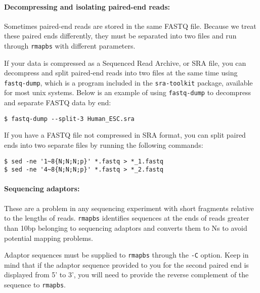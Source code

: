 \documentclass[10pt]{article}
\newcommand{\prog}[1]{\texttt{#1}}
\newcommand{\op}[1]{\texttt{#1}}
\begin{document}
\paragraph{Decompressing and isolating paired-end reads:}
Sometimes paired-end reads are stored in the same FASTQ file.  Because
we treat these paired ends differently, they must be separated into
two files and run through \prog{rmapbs} with different parameters.

If your data is compressed as a Sequenced Read Archive, or SRA file, you can
decompress and split paired-end reads into two files at the same time using
 \prog{fastq-dump}, which is a program included in the \prog{sra-toolkit} 
package, available for most unix systems.  Below is an example of using
\prog{fastq-dump} to decompress and separate FASTQ data by end:
\begin{verbatim}
$ fastq-dump --split-3 Human_ESC.sra
\end{verbatim}

If you have a FASTQ file not compressed in SRA format, you can split paired ends
into two separate files by running the following commands:
\begin{verbatim}
$ sed -ne '1~8{N;N;N;p}' *.fastq > *_1.fastq
$ sed -ne '4~8{N;N;N;p}' *.fastq > *_2.fastq
\end{verbatim}

\paragraph{Sequencing adaptors:}
These are a problem in any sequencing experiment with short fragments
relative to the lengths of reads.  \prog{rmapbs} identifies sequences at the
ends of reads greater than 10bp belonging to sequencing adaptors and
converts them to Ns to avoid potential mapping problems.

Adaptor sequences must be supplied to \prog{rmapbs} through the \op{-C}
option.  Keep in mind that if the adaptor sequence provided to you for
the second paired end is displayed from 5' to 3', you will need to
provide the reverse complement of the sequence to \prog{rmapbs}.



\end{document}
